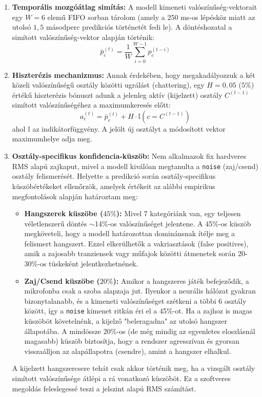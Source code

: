 \begin{enumerate}
  \item \textbf{Temporális mozgóátlag simítás:} A modell kimeneti valószínűség-vektorait egy $W = 6$ elemű FIFO sorban tárolom (amely a 250 ms-os lépésköz miatt az utolsó $1,5$ másodperc predikciós történetét fedi le). A döntéshozatal a simított valószínűség-vektor alapján történik:
  $$\bar{p}_c^{(t)} = \frac{1}{W} \sum_{i=0}^{W-1} p_c^{(t-i)}$$
  
  \item \textbf{Hiszterézis mechanizmus:} Annak érdekében, hogy megakadályozzuk a két közeli valószínűségű osztály közötti ugrálást (chattering), egy $H = 0,05$ ($5\%$) értékű hiszterézis bónuszt adunk a jelenleg aktív (kijelzett) osztály $C^{(t-1)}$ simított valószínűségéhez a maximumkeresés előtt:
  $$a_c^{(t)} = \bar{p}_c^{(t)} + H \cdot \mathbb{I}(c = C^{(t-1)})$$
  ahol $\mathbb{I}$ az indikátorfüggvény. A jelölt új osztályt a módosított vektor maximumhelye adja meg.
  
  \item \textbf{Osztály-specifikus konfidencia-küszöb:} Nem alkalmazok fix hardveres RMS alapú zajkaput, mivel a modell kiválóan megtanulta a \texttt{noise} (zaj/csend) osztály felismerését. Helyette a predikció során osztály-specifikus küszöbértékeket ellenőrzök, amelyek értékeit az alábbi empirikus megfontolások alapján határoztam meg:
  \begin{itemize}
      \item \textbf{Hangszerek küszöbe ($45\%$):} Mivel 7 kategóriánk van, egy teljesen véletlenszerű döntés $\sim$14\%-os valószínűséget jelentene. A 45\%-os küszöb megköveteli, hogy a modell határozottan dominánsnak ítélje meg a felismert hangszert. Ezzel elkerülhetők a vakriasztások (false positives), amik a zajosabb tranziensek vagy műfajok közötti átmenetek során 20-30\%-os tüskeként jelentkezhetnének.
      \item \textbf{Zaj/Csend küszöbe ($20\%$):} Amikor a hangszeres játék befejeződik, a mikrofonba csak a szoba alapzaja jut. Ilyenkor a neurális hálózat gyakran bizonytalanabb, és a kimeneti valószínűséget szétkeni a többi 6 osztály között, így a \texttt{noise} kimenet ritkán éri el a 45\%-ot. Ha a zajhoz is magas küszöböt követelnénk, a kijelző "beleragadna" az utolsó hangszer állapotába. A mindössze 20\%-os (de még mindig az egyenletes eloszlásnál magasabb) küszöb biztosítja, hogy a rendszer agresszívan és gyorsan visszaálljon az alapállapotra (csendre), amint a hangszer elhalkul.
  \end{itemize}
  A kijelzett hangszercsere tehát csak akkor történik meg, ha a vizsgált osztály simított valószínűsége átlépi a rá vonatkozó küszöböt. Ez a szoftveres megoldás feleslegessé teszi a jelszint alapú RMS számítást.
\end{enumerate}

